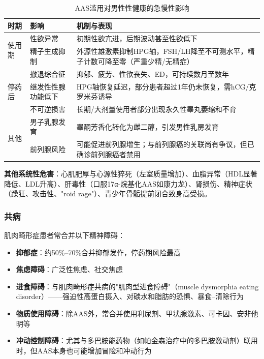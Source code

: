 \documentclass[12pt,a4paper,twoside]{ctexbook}
\begin{document}
\begin{table}[htbp]
\centering
\caption{AAS滥用对男性性健康的急慢性影响}
\label{tab:aas_sexual_effects}
\begin{tabularx}{\textwidth}{@{}llX@{}}
    \toprule
    \textbf{时期} & \textbf{影响} & \textbf{机制与表现} \\
    \midrule
    \multirow{2}{*}{使用期} & 性欲异常 & 初期性欲亢进，后期波动甚至性欲低下 \\
     & 精子生成抑制 & 外源性雄激素抑制HPG轴，FSH/LH降至不可测水平，精子计数可降至零（严重少精/无精症） \\
    \midrule
    \multirow{3}{*}{停药后} & 撤退综合征 & 抑郁、疲劳、性欲丧失、ED，可持续数月至数年 \\
     & 继发性性腺功能低下 & HPG轴恢复延迟，部分患者超过1年仍未恢复，需hCG/克罗米芬诱导 \\
     & 不可逆损害 & 长期/大剂量使用者部分出现永久性睾丸萎缩和不育 \\
    \midrule
    \multirow{2}{*}{其他} & 男子乳腺发育 & 睾酮芳香化转化为雌二醇，引发男性乳房发育 \\
     & 前列腺风险 & 可能促进前列腺增生；与前列腺癌的关联尚有争议，但已确诊前列腺癌者禁用 \\
    \bottomrule
\end{tabularx}
\end{table}

\textbf{其他系统性危害}：心肌肥厚与心源性猝死（左室质量增加）、血脂异常（HDL显著降低、LDL升高）、肝毒性（口服17α-烷基化AAS如康力龙）、肾损伤、精神症状（躁狂、攻击性、"roid rage"）、青少年骨骺提前闭合致身高受损。

\subsubsection{共病}

肌肉畸形症患者常合并以下精神障碍：

\begin{itemize}[leftmargin=2cm]
	\item \textbf{抑郁症}：约50\%--70\%合并抑郁发作，停药期风险最高
	\item \textbf{焦虑障碍}：广泛性焦虑、社交焦虑
	\item \textbf{进食障碍}：与肌肉畸形症共病的"肌肉型进食障碍"（muscle dysmorphia eating disorder）——强迫性高蛋白摄入、对碳水和脂肪的恐惧、暴食--清除行为
	\item \textbf{物质使用障碍}：除AAS外，常合并使用利尿剂、甲状腺激素、可卡因、安非他明等
	\item \textbf{冲动控制障碍}：尤其与多巴胺能药物（如帕金森治疗中的多巴胺激动剂）联用时，但AAS本身也可能增加冒险和冲动行为
\end{itemize}
\end{document}
